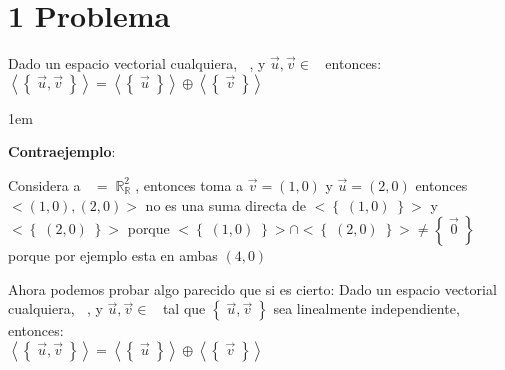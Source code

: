 \documentclass[12pt, fleqn]{article}                             %
\newenvironment{SmallIndentation}[1][0.75em]                    %
        {\begin{adjustwidth}{#1}{}\begin{footnotesize}}             %
        {\end{footnotesize}\end{adjustwidth}}                       %
\theoremstyle{break}                                            %
\DeclareMathOperator \Reals        {\mathbb{R}}                 %
\DeclareMathOperator \GenericField {\mathbb{F}}                 %
\DeclareMathOperator \VectorSet    {\mathbb{V}}                 %
\DeclareMathOperator \VectorSpace  {\VectorSet_{\GenericField}} %
\newcommand{\Set}[1]    {\left\{ \; #1 \; \right\}}             %
\newcommand{\Wrap}[1]    {\left( #1 \right)}                    %
\newcommand{\Generate}[1]{\left\langle #1 \right\rangle}        %
\begin{document}
\restoregeometry                                                    %
\nopagecolor                                                        %




\tableofcontents{}
\label{sec:Index}

\clearpage




\clearpage
\section{1 Problema}

    Dado un espacio vectorial cualquiera, $\VectorSpace$, y $\vec u, \vec v \in \VectorSpace$
    entonces:\\
    $\Generate{\Set{\vec u, \vec v}} = \Generate{\Set{\vec u}} \oplus \Generate{\Set{\vec v}}$

    \begin{SmallIndentation}[1em]
        \textbf{Contraejemplo}:
        
        Considera a $\VectorSpace = \Reals^2_{\Reals}$, entonces toma a $\vec v = (1, 0)$ y $\vec u = (2, 0)$
        entonces $<{(1, 0), (2, 0)}>$ no es una suma directa de $<\Set{(1, 0)}>$ y $<\Set{(2, 0)}>$ porque 
        $<\Set{(1, 0)}> \cap <\Set{(2, 0)}> \neq \Set{\vec 0}$ porque por ejemplo esta en ambas $(4, 0)$

    \end{SmallIndentation}

    \vspace{2em}

    Ahora podemos probar algo parecido que si es cierto:
    Dado un espacio vectorial cualquiera, $\VectorSpace$, y $\vec u, \vec v \in \VectorSpace$ tal que
    $\Set{\vec u, \vec v}$ sea linealmente independiente, entonces:\\
    $\Generate{\Set{\vec u, \vec v}} = \Generate{\Set{\vec u}} \oplus \Generate{\Set{\vec v}}$
\end{document}
